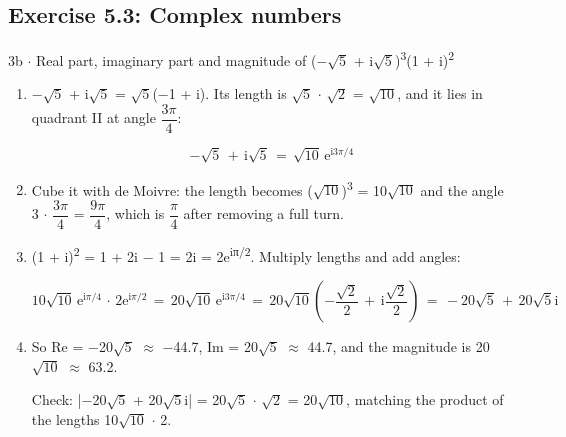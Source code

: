 \documentclass[11pt]{article}
\begin{document}
\begin{keepsection}\subsection{Exercise 5.3: Complex numbers}

\begin{workedbox}{3b \ensuremath{\cdot} Real part, imaginary part and magnitude of (\ensuremath{-}\ensuremath{\sqrt{5}} + i\ensuremath{\sqrt{5}})\textsuperscript{3}(1 + i)\textsuperscript{2}}
\begin{enumerate}
\item {}
\ensuremath{-}\ensuremath{\sqrt{5}} + i\ensuremath{\sqrt{5}} = \ensuremath{\sqrt{5}}(\ensuremath{-}1 + i). Its length is \ensuremath{\sqrt{5}} \ensuremath{\cdot} \ensuremath{\sqrt{2}} = \ensuremath{\sqrt{10}}, and it lies in quadrant II at angle {\small\ensuremath{\dfrac{3π}{4}}}:

\begin{equation*}-\sqrt{5}\, +\, \mathrm{i}\sqrt{5}\, =\, \sqrt{10}\, \mathrm{e}^{\mathrm{i}3π/4}\end{equation*}
\item Cube it with de Moivre: the length becomes (\ensuremath{\sqrt{10}})\textsuperscript{3} = 10\ensuremath{\sqrt{10}} and the angle 3 \ensuremath{\cdot} {\small\ensuremath{\dfrac{3π}{4}}} = {\small\ensuremath{\dfrac{9π}{4}}}, which is {\small\ensuremath{\dfrac{π}{4}}} after removing a full turn.
\item {}
(1 + i)\textsuperscript{2} = 1 + 2i \ensuremath{-} 1 = 2i = 2e\textsuperscript{iπ/2}. Multiply lengths and add angles:

\begin{equation*}10\sqrt{10}\, \mathrm{e}^{\mathrm{i}π/4}\, \cdot \, 2\mathrm{e}^{\mathrm{i}π/2}\, =\, 20\sqrt{10}\, \mathrm{e}^{\mathrm{i}3π/4}\, =\, 20\sqrt{10}\left(-\dfrac{\sqrt{2}}{2}\, +\, \mathrm{i}\dfrac{\sqrt{2}}{2}\right)\, =\, -20\sqrt{5}\, +\, 20\sqrt{5}\mathrm{i}\end{equation*}
\item {}
So Re = \ensuremath{-}20\ensuremath{\sqrt{5}} \ensuremath{\approx} \ensuremath{-}44.7, Im = 20\ensuremath{\sqrt{5}} \ensuremath{\approx} 44.7, and the magnitude is 20\ensuremath{\sqrt{10}} \ensuremath{\approx} 63.2.

Check: |\ensuremath{-}20\ensuremath{\sqrt{5}} + 20\ensuremath{\sqrt{5}}i| = 20\ensuremath{\sqrt{5}} \ensuremath{\cdot} \ensuremath{\sqrt{2}} = 20\ensuremath{\sqrt{10}}, matching the product of the lengths 10\ensuremath{\sqrt{10}} \ensuremath{\cdot} 2.
\end{enumerate}
\end{workedbox}

\end{keepsection}
\end{document}

